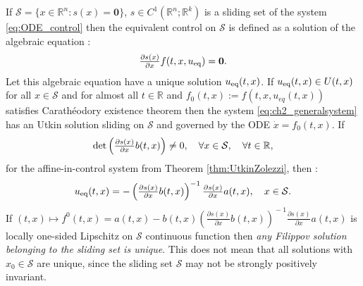 \documentclass{article}
\newcommand{\R}{\mathbb{R}}
\newcommand{\zero}{\mathbf{0}}
\begin{document}
If $\mathcal{S}=\{x\in \R^n: s(x)=\zero\}$, $s\in C^{1}(\R^n;\R^k)$ is a sliding set of the system  \eqref{eq:ODE_control} then the equivalent control 
on $\mathcal{S}$ is defined as a solution of the algebraic equation  \cite{Utkin1992:Book}:\vspace{-1mm}
\begin{equation}\label{eq:equation_for_u_eq}
\tfrac{\partial s(x)}{\partial x}f(t,x,u_{\rm eq})=\zero.\vspace{-1mm}
\end{equation}
Let  this algebraic equation have a  unique solution $u_{\rm eq}(t,x)$. If  $u_{\rm eq}(t,x)\in U(t,x)$ for all $x\in \mathcal{S}$ and for almost all $t\in \R$  and $f_0(t,x):=f(t,x, u_{eq}(t,x))$ satisfies Carath\'{e}odory existence theorem then  the system \eqref{eq:ch2_generalsystem} has an Utkin solution sliding on $\mathcal{S}$ and governed by the ODE $\dot x=f_0(t,x)$. If  \vspace{-1mm}
\begin{equation}\label{eq:con_utkin_unique}
	\det\left(\tfrac{\partial s(x)}{\partial x}b(t,x)\right)\neq 0, \quad \forall x\in \mathcal{S}, \quad \forall t\in \R,\vspace{-1mm}
\end{equation}
for the affine-in-control system from Theorem \ref{thm:UtkinZolezzi}, then \cite{Utkin1992:Book}:
\vspace{-1mm}
 \begin{equation}
 	u_{\rm eq}(t,x)=-\left(\tfrac{\partial s(x)}{\partial x}b(t,x)\right)^{-1}\tfrac{\partial s(x)}{\partial x}a(t,x), \quad x\in \mathcal{S}.\vspace{-2mm}
 \end{equation} 
 If $(t,x)\!\mapsto\!\!f^0(t,x)\!=\!a(t,x)\!-\!b(t,x)\!\left(\!\frac{\partial s(x)}{\partial x}b(t,x)\!\right)^{\!\!-\!1}\!\!\frac{\partial s(x)}{\partial x}a(t,x)$ is locally one-sided Lipschitz on $\mathcal{S}$ continuous function  then \textit{any Filippov solution belonging to the sliding set is unique}.
 This does not mean that all solutions with $x_0\in \mathcal{S}$ are unique, since  the sliding set $\mathcal{S}$ may not be strongly positively invariant.
 
 \vspace{-1mm}
\end{document}
